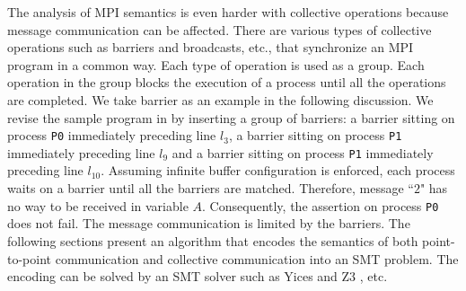 
The analysis of MPI semantics is even harder with collective operations because message communication can be affected. There are various types of collective operations such as barriers and broadcasts, etc., that synchronize an MPI program in a common way. Each type of operation is used as a group. Each operation in the group blocks the execution of a process until all the operations are completed. We take barrier as an example in the following discussion. We revise the sample program in  by inserting a group of barriers: a barrier sitting on process \texttt{P0} immediately preceding line $l_3$, a barrier sitting on process \texttt{P1} immediately preceding line $l_9$ and a barrier sitting on process \texttt{P1} immediately preceding line $l_{10}$. Assuming infinite buffer configuration is enforced, each process waits on a barrier until all the barriers are matched. Therefore, message ``$2$" has no way to be received in variable $A$. Consequently, the assertion on process \texttt{P0} does not fail. The message communication is limited by the barriers. The following sections present an algorithm that encodes the semantics of both point-to-point communication and collective communication into an SMT problem. The encoding can be solved by an SMT solver such as Yices \cite{dutertre:CAV06} and Z3 \cite{demoura:tacas08}, etc.






